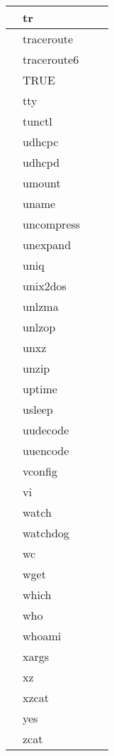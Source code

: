 \begin{longtable}{llp{120mm}p{120mm}}
      & tr \\
     \hline
      & traceroute \\
     \hline
      & traceroute6 \\
     \hline
      & TRUE \\
     \hline
      & tty \\
     \hline
      & tunctl \\
     \hline
      & udhcpc \\
     \hline
      & udhcpd \\
     \hline
      & umount \\
     \hline
      & uname \\
     \hline
      & uncompress \\
     \hline
      & unexpand \\
     \hline
      & uniq \\
     \hline
      & unix2dos \\
     \hline
      & unlzma \\
     \hline
      & unlzop \\
     \hline
      & unxz \\
     \hline
      & unzip \\
     \hline
      & uptime \\
     \hline
      & usleep \\
     \hline
      & uudecode \\
     \hline
      & uuencode \\
     \hline
      & vconfig \\
     \hline
      & vi \\
     \hline
      & watch \\
     \hline
      & watchdog \\
     \hline
      & wc \\
     \hline
      & wget \\
     \hline
      & which \\
     \hline
      & who \\
     \hline
      & whoami \\
     \hline
      & xargs \\
     \hline
      & xz \\
     \hline
      & xzcat \\
     \hline
      & yes \\
     \hline
      & zcat \\
     \hline
\end{longtable}

